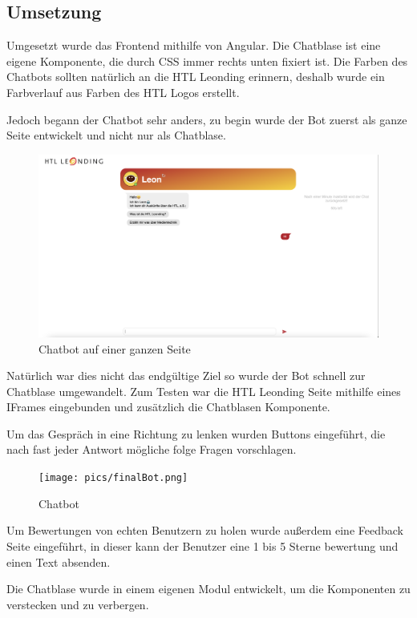 \subsection{Umsetzung}
Umgesetzt wurde das Frontend mithilfe von Angular. Die Chatblase ist eine eigene Komponente, die durch CSS immer rechts unten fixiert ist. Die Farben des Chatbots sollten natürlich an die HTL Leonding erinnern, deshalb wurde ein Farbverlauf aus Farben des HTL Logos erstellt.

Jedoch begann der Chatbot sehr anders, zu begin wurde der Bot zuerst als ganze Seite entwickelt und nicht nur als Chatblase.
\begin{figure}[hbt!]
    \centering
    \includegraphics[scale=0.2]{pics/fullPageBot.png}
    \caption{Chatbot auf einer ganzen Seite}
    \label{fig:impl:conceptBotFullPage}
\end{figure}

Natürlich war dies nicht das endgültige Ziel so wurde der Bot schnell zur Chatblase umgewandelt.
Zum Testen war die HTL Leonding Seite mithilfe eines IFrames eingebunden und zusätzlich die Chatblasen Komponente.

Um das Gespräch in eine Richtung zu lenken wurden Buttons eingeführt, die nach fast jeder Antwort mögliche folge Fragen vorschlagen.

\begin{figure}[hbt!]
    \centering
    \texttt{[image: pics/finalBot.png]}
    \caption{Chatbot}
    \label{fig:impl:bot}
\end{figure}

Um Bewertungen von echten Benutzern zu holen wurde außerdem eine Feedback Seite eingeführt, in dieser kann der Benutzer eine 1 bis 5 Sterne bewertung und einen Text absenden.



Die Chatblase wurde in einem eigenen Modul entwickelt, um die Komponenten zu verstecken und zu verbergen.

